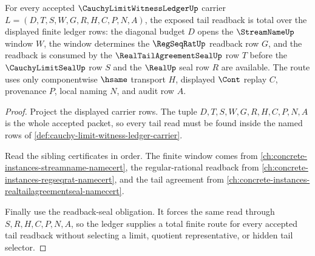 \begin{theorem}
\label{thm:cauchy-limit-witness-ledger-tail-readback-totality}
For every accepted $\CauchyLimitWitnessLedgerUp$ carrier $L=(D,T,S,W,G,R,H,C,P,N,A)$, the exposed tail readback is total over the displayed finite ledger rows: the diagonal budget $D$ opens the $\StreamNameUp$ window $W$, the window determines the $\RegSeqRatUp$ readback row $G$, and the readback is consumed by the $\RealTailAgreementSealUp$ row $T$ before the $\CauchyLimitSealUp$ row $S$ and the $\RealUp$ seal row $R$ are available. The route uses only componentwise $\hsame$ transport $H$, displayed $\Cont$ replay $C$, provenance $P$, local naming $N$, and audit row $A$.
\end{theorem}
\begin{proof}
Project the displayed carrier rows. The tuple $D,T,S,W,G,R,H,C,P,N,A$ is the whole accepted packet, so every tail read must be found inside the named rows of \autoref{def:cauchy-limit-witness-ledger-carrier}.

Read the sibling certificates in order. The finite window comes from \autoref{ch:concrete-instances-streamname-namecert}, the regular-rational readback from \autoref{ch:concrete-instances-regseqrat-namecert}, and the tail agreement from \autoref{ch:concrete-instances-realtailagreementseal-namecert}.

Finally use the readback-seal obligation. It forces the same read through $S,R,H,C,P,N,A$, so the ledger supplies a total finite route for every accepted tail readback without selecting a limit, quotient representative, or hidden tail selector.
\end{proof}

